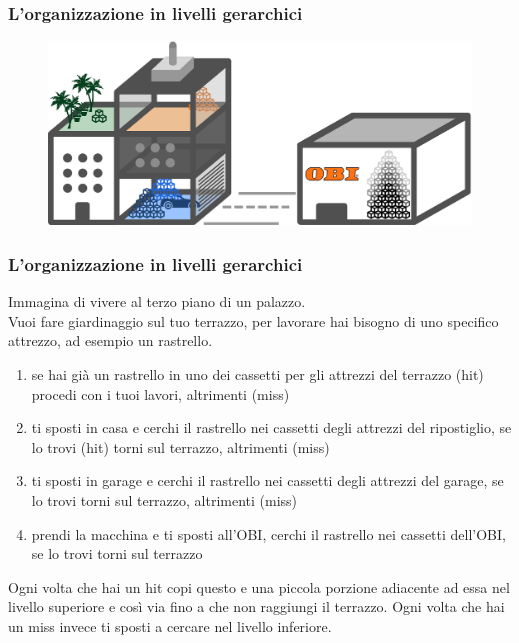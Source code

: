 \begin{frame}
	\frametitle{L'organizzazione in livelli gerarchici}
	 
	\begin{figure}[!htbp] 
		\centering
		\includegraphics[width=1.0\linewidth]{images/5_memory/gardening.pdf}
	\end{figure}
	
\end{frame}

\begin{frame}
	\frametitle{L'organizzazione in livelli gerarchici}
	 
	 Immagina di vivere al terzo piano di un palazzo.\\
	 Vuoi fare giardinaggio sul tuo terrazzo, per lavorare hai bisogno di uno specifico attrezzo, ad esempio un rastrello. \pause
	 \begin{enumerate}
	 	\item se hai già un rastrello in uno dei cassetti per gli attrezzi del terrazzo (hit) procedi con i tuoi lavori, altrimenti (miss) \pause
	 	\item ti sposti in casa e cerchi il rastrello nei cassetti degli attrezzi del ripostiglio, se lo trovi (hit) torni sul terrazzo, altrimenti (miss) \pause
	 	\item ti sposti in garage e cerchi il rastrello nei cassetti degli attrezzi del garage, se lo trovi torni sul terrazzo, altrimenti (miss) \pause
	 	\item prendi la macchina e ti sposti all'OBI, cerchi il rastrello nei cassetti dell'OBI, se lo trovi torni sul terrazzo \pause
	 \end{enumerate}
	 Ogni volta che hai un hit copi questo e una piccola porzione adiacente ad essa nel livello superiore e così via fino a che non raggiungi il terrazzo. \pause
	 Ogni volta che hai un miss invece ti sposti a cercare nel livello inferiore.
	
\end{frame}


